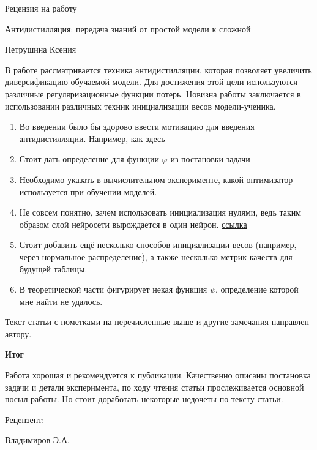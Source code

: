 \documentclass[a4paper, 12pt]{article}
\begin{document}
	\begin{center}
		Рецензия на работу
		
		Антидистилляция: передача знаний от простой модели к сложной
		
		Петрушина Ксения
	\end{center}
В работе рассматривается техника антидистилляции, которая позволяет увеличить диверсификацию обучаемой модели. 
Для достижения этой цели используются различные регуляризационные функции потерь. 
Новизна работы заключается в использовании различных техник инициализации весов модели-ученика. 

\begin{enumerate}
	\item Во введении было бы здорово ввести мотивацию для введения антидистилляции. Например, как \href{https://arxiv.org/pdf/2010.09923.pdf}{здесь}
	\item Стоит дать определение для функции $\varphi$ из постановки задачи
	\item Необходимо указать в вычислительном эксперименте, какой оптимизатор используется при обучении моделей.
	\item Не совсем понятно, зачем использовать инициализация нулями, ведь таким образом слой нейросети вырождается в один нейрон. \href{https://medium.com/@safrin1128/weight-initialization-in-neural-network-inspired-by-andrew-ng-e0066dc4a566#:~:text=Zero%20initialization%3A&text=If%20all%20the%20weights%20are,will%20produce%20a%20poor%20result.}{ссылка}
	\item Стоит добавить ещё несколько способов инициализации весов (например, через нормальное распределение), а также несколько метрик качеств для будущей таблицы.
	\item В теоретической части фигурирует некая функция $\psi$, определение которой мне найти не удалось.
\end{enumerate}

Текст статьи с пометками на перечисленные выше и другие замечания направлен автору.  

\textbf{Итог}

Работа хорошая и рекомендуется к публикации. 
Качественно описаны постановка задачи и детали эксперимента, по ходу чтения статьи прослеживается основной посыл работы. 
Но стоит доработать некоторые недочеты по тексту статьи.

Рецензент:

Владимиров Э.А.
\end{document}
